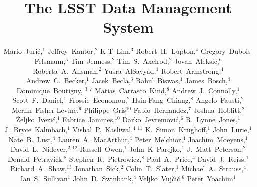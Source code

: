 \documentclass[11pt,twoside]{article}
\begin{document}
\title{The LSST Data Management System}
\author{
Mario~Juri\'c,$^1$
Jeffrey~Kantor,$^2$
K-T~Lim,$^3$
Robert~H.~Lupton,$^4$
Gregory~Dubois-Felsmann,$^5$
Tim~Jenness,$^2$
Tim~S.~Axelrod,$^2$
Jovan~Aleksi\'c,$^6$
Roberta~A.~Allsman,$^2$
Yusra~AlSayyad,$^1$
Robert~Armstrong,$^4$
Andrew~C.~Becker,$^1$
Jacek~Becla,$^3$
Rahul~Biswas,$^1$
James~Bosch,$^4$
Dominique~Boutigny, $^{3,7}$
Matias~Carrasco~Kind,$^8$
Andrew~J.~Connolly,$^1$
Scott~F.~Daniel,$^1$
Frossie~Economou,$^2$
Hsin-Fang~Chiang,$^8$
Angelo~Fausti,$^2$
Merlin~Fisher-Levine,$^9$
Philippe~Gris$^{10}$
Fabio~Hernandez,$^7$
Joshua~Hoblitt,$^2$
\v{Z}eljko~Ivezi\'{c},$^1$
Fabrice~Jammes,$^{10}$
Darko~Jevremovi\'c,$^6$
R.~Lynne~Jones,$^1$
J.~Bryce~Kalmbach,$^1$
Vishal~P.~Kasliwal,$^{4,11}$
K.~Simon~Krughoff,$^1$
John~Lurie,$^1$
Nate~B.~Lust,$^4$
Lauren~A.~MacArthur,$^4$
Peter~Melchior,$^4$
Joachim~Moeyens,$^1$
David~L.~Nidever,$^{2,12}$
Russell~Owen,$^1$
John~K~Parejko,$^1$
J.~Matt~Peterson,$^2$
Donald~Petravick,$^8$
Stephen~R.~Pietrowicz,$^8$
Paul~A.~Price,$^4$
David~J.~Reiss,$^1$
Richard~A.~Shaw,$^{13}$
Jonathan~Sick,$^2$
Colin~T.~Slater,$^1$
Michael~A.~Strauss,$^4$
Ian~S.~Sullivan$^1$
John~D.~Swinbank,$^4$
Veljko~Vuj\v ci\'c,$^6$
Peter~Yoachim$^1$
%
}
\end{document}
